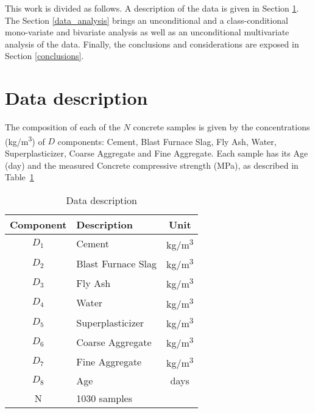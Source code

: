 \documentclass[conference]{IEEEtran}
\begin{document}
This work is divided as follows. A description of the data is given in Section \ref{data_description}. The Section \ref{data_analysis} brings an unconditional and a class-conditional mono-variate and bivariate analysis as well as an unconditional multivariate analysis of the data. Finally, the conclusions and considerations are exposed in Section \ref{conclusions}.


\section{Data description}\label{data_description}

The composition of each of the $N$ concrete samples is given by the concentrations (kg/m\textsuperscript{3}) of $D$ components: Cement, Blast Furnace Slag, Fly Ash, Water, Superplasticizer, Coarse Aggregate and Fine Aggregate. Each sample has its Age (day) and the measured Concrete compressive strength (MPa), as described in Table~\ref{data_description_table}

\begin{table}[htp]
\caption{Data description}
\begin{center}
  \begin{tabular}{@{} clc @{}}
    \toprule
    Component & Description & Unit \\ 
    \midrule
    $D_1$ & Cement & kg/m\textsuperscript{3} \\ 
    $D_2$ & Blast Furnace Slag & kg/m\textsuperscript{3} \\ 
    $D_3$ & Fly Ash & kg/m\textsuperscript{3} \\ 
    $D_4$ & Water & kg/m\textsuperscript{3} \\ 
    $D_5$ & Superplasticizer & kg/m\textsuperscript{3} \\ 
    $D_6$ & Coarse Aggregate & kg/m\textsuperscript{3} \\ 
    $D_7$ & Fine Aggregate & kg/m\textsuperscript{3} \\ 
    $D_8$ & Age & days \\ 
	\midrule
    N & 1030 samples&  \\ 
    \bottomrule
  \end{tabular}
\end{center}
\label{data_description_table}
\end{table}%
\end{document}
